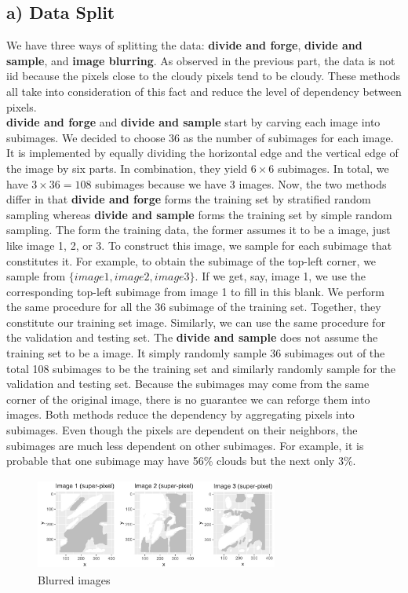 \documentclass[jou]{apa}%
\begin{document}
\subsection{a) Data Split}
We have three ways of splitting the data: \textbf{divide and forge}, \textbf{divide and sample}, and \textbf{image blurring}. As observed in the previous part, the data is not iid because the pixels close to the cloudy pixels tend to be cloudy. These methods all take into consideration of this fact and reduce the level of dependency between pixels.\\
\indent \textbf{divide and forge} and \textbf{divide and sample} start by carving each image into subimages. We decided to choose 36 as the number of subimages for each image. It is implemented by equally dividing the horizontal edge and the vertical edge of the image by six parts. In combination, they yield $6 \times 6$ subimages. In total, we have $3 \times 36 = 108$ subimages because we have 3 images. Now, the two methods differ in that \textbf{divide and forge} forms the training set by stratified random sampling whereas \textbf{divide and sample} forms the training set by simple random sampling. The form the training data, the former assumes it to be a image, just like image 1, 2, or 3. To construct this image, we sample for each subimage that constitutes it. For example, to obtain the subimage of the top-left corner, we sample from $\{image1, image2, image3\}$. If we get, say, image 1, we use the corresponding top-left subimage from image 1 to fill in this blank. We perform the same procedure for all the 36 subimage of the training set. Together, they constitute our training set image. Similarly, we can use the same procedure for the validation and testing set. The \textbf{divide and sample} does not assume the training set to be a image. It simply randomly sample 36 subimages out of the total 108 subimages to be the training set and similarly randomly sample for the validation and testing set. Because the subimages may come from the same corner of the original image, there is no guarantee we can reforge them into images. Both methods reduce the dependency by aggregating pixels into subimages. Even though the pixels are dependent on their neighbors, the subimages are much less dependent on other subimages. For example, it is probable that one subimage may have 56\% clouds but the next only 3\%.\\
 \vspace*{-0.1cm}\begin{figure}[H]\hspace*{-0.5cm}\centering\includegraphics[width = 8cm, height = 3cm]{blur}\caption{Blurred images}\end{figure}
\end{document}

